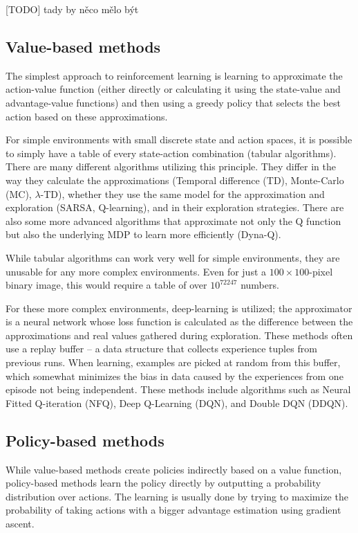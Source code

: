 \documentclass[
  digital,     %
  oneside,     %
  nosansbold,  %
  nocolorbold, %
  lof,         %
  lot,         %
]{fithesis4}
\begin{document}
[TODO] tady by něco mělo být

\subsection{Value-based methods}

The simplest approach to reinforcement learning is learning to approximate the action-value function (either directly or calculating it using the state-value and advantage-value functions) and then using a greedy policy that selects the best action based on these approximations.

For simple environments with small discrete state and action spaces, it is possible to simply have a table of every state-action combination (tabular algorithms). There are many different algorithms utilizing this principle. They differ in the way they calculate the approximations (Temporal difference (TD), Monte-Carlo (MC), $\lambda$-TD), whether they use the same model for the approximation and exploration (SARSA, Q-learning), and in their exploration strategies. There are also some more advanced algorithms that approximate not only the Q function but also the underlying MDP to learn more efficiently (Dyna-Q).

While tabular algorithms can work very well for simple environments, they are unusable for any more complex environments. Even for just a $100 \times 100$-pixel binary image, this would require a table of over $10^{72247}$ numbers.

For these more complex environments, deep-learning is utilized; the approximator is a neural network whose loss function is calculated as the difference between the approximations and real values gathered during exploration. These methods often use a replay buffer -- a data structure that collects experience tuples from previous runs. When learning, examples are picked at random from this buffer, which somewhat minimizes the bias in data caused by the experiences from one episode not being independent. These methods include algorithms such as Neural Fitted Q-iteration (NFQ), Deep Q-Learning (DQN), and Double DQN (DDQN).

\subsection{Policy-based methods}

While value-based methods create policies indirectly based on a value function, policy-based methods learn the policy directly by outputting a probability distribution over actions. The learning is usually done by trying to maximize the probability of taking actions with a bigger advantage estimation using gradient ascent.
\end{document}
